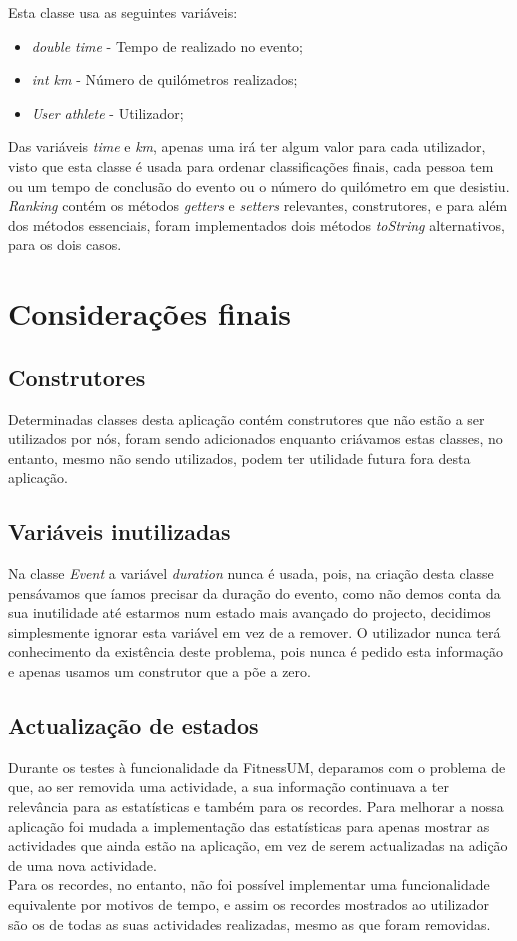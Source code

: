 \documentclass[10pt,notitlepage]{article}
\begin{document}
Esta classe usa as seguintes variáveis:
\begin{itemize}
\item \textit{double time} - Tempo de realizado no evento;
\item \textit{int km} - Número de quilómetros realizados;
\item \textit{User athlete} - Utilizador;
\end{itemize}
Das variáveis \textit{time} e \textit{km}, apenas uma irá ter algum valor para cada utilizador, visto que esta classe é usada para ordenar classificações finais, cada pessoa tem ou um tempo de conclusão do evento ou o número do quilómetro em que desistiu. \textit{Ranking} contém os métodos \textit{getters} e \textit{setters} relevantes, construtores, e para além dos métodos essenciais, foram implementados dois métodos \textit{toString} alternativos, para os dois casos.






    
\section{Considerações finais}

\subsection{Construtores}
Determinadas classes desta aplicação contém construtores que não estão a ser utilizados por nós, foram sendo adicionados enquanto criávamos estas classes, no entanto, mesmo não sendo utilizados, podem ter utilidade futura fora desta aplicação. 

\subsection{Variáveis inutilizadas}
Na classe \textit{Event} a variável \textit{duration} nunca é usada, pois, na criação desta classe pensávamos que íamos precisar da duração do evento, como não demos conta da sua inutilidade até estarmos num estado mais avançado do projecto, decidimos simplesmente ignorar esta variável em vez de a remover. O utilizador nunca terá conhecimento da existência deste problema, pois nunca é pedido esta informação e apenas usamos um construtor que a põe a zero.

\subsection{Actualização de estados}
Durante os testes à funcionalidade da FitnessUM, deparamos com o problema de que, ao ser removida uma actividade, a sua informação continuava a ter relevância para as estatísticas e também para os recordes.
Para melhorar a nossa aplicação foi mudada a implementação das estatísticas para apenas mostrar as actividades que ainda estão na aplicação, em vez de serem actualizadas na adição de uma nova actividade.\\
Para os recordes, no entanto, não foi possível implementar uma funcionalidade equivalente por motivos de tempo, e assim os recordes mostrados ao utilizador são os de todas as suas actividades realizadas, mesmo as que foram removidas.
\end{document}
